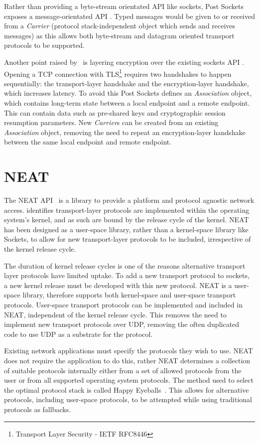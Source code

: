 Rather than providing a byte-stream orientated API like sockets, Post Sockets exposes a message-orientated API .
Typed messages would be given to or received from a \emph{Carrier} (protocol stack-independent object which sends and
receives messages) as this allows both byte-stream and datagram oriented transport protocols to be supported.

Another point raised by~\cite{kuhlewind_postsocketsabstract_} is layering encryption over the existing sockets API .
Opening a TCP connection with
TLS\footnote{Transport Layer Security - IETF RFC8446} requires two handshakes to happen sequentially: the
transport-layer handshake and the encryption-layer handshake, which increases latency.
To avoid this Post Sockets defines an \emph{Association} object, which contains long-term state between a local endpoint
and a remote endpoint.
This can contain data such as pre-shared keys and cryptographic session resumption parameters.
New \emph{Carrier}s can be created from an existing \emph{Association} object, removing the need to repeat an
encryption-layer handshake between the same local endpoint and remote endpoint.

\section{NEAT}\label{sec:neat}
The NEAT API~\citep{khademi_neatplatformprotocolindependent_2017} is a library to provide a platform and protocol
agnostic network access.
\citet{khademi_neatplatformprotocolindependent_2017} identifies transport-layer protocols are implemented within the
operating system's kernel, and as such are bound by the release cycle of the kernel.
NEAT has been designed as a user-space library, rather than a kernel-space library like Sockets, to allow for new
transport-layer protocols to be included, irrespective of the kernel release cycle.

The duration of kernel release cycles is one of the reasons alternative transport layer protocols have limited uptake.
To add a new transport protocol to sockets, a new kernel release must be developed with this new protocol.
NEAT is a user-space library, therefore supports both kernel-space and user-space transport protocols.
User-space transport protocols can be implemented and included in NEAT, independent of the kernel release cycle.
This removes the need to implement new transport protocols over UDP,
removing the often duplicated code to use UDP as a substrate for the protocol.

Existing network applications must specify the protocols they wish to use.
NEAT does not require the application to do this, rather NEAT determines a collection of suitable protocols internally
either from a set of allowed protocols from the user or from all supported operating system protocols.
The method used to select the optimal protocol stack is called Happy Eyeballs~\citep{pauly_happyeyeballsversion_}.
This allows for alternative protocols, including user-space protocols, to be attempted while using traditional protocols
as fallbacks.

